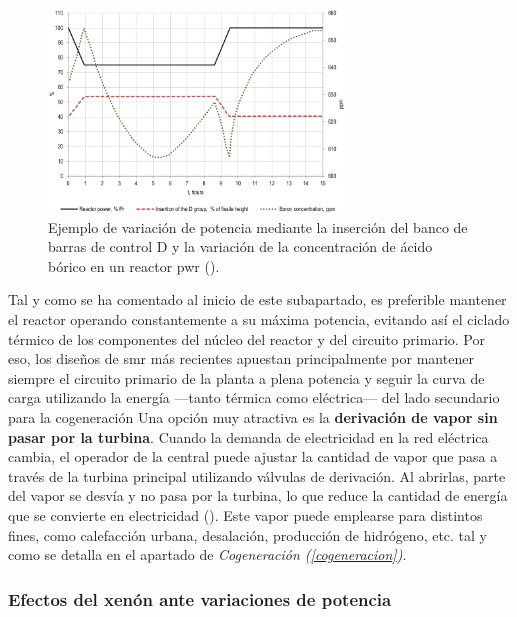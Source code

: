 \begin{figure}[h]
  \centering
  \includegraphics[width=0.7\textwidth]{content/figures/seguimiento_carga_barras_y_boro.png}
  \caption{Ejemplo de variación de potencia mediante la inserción del banco de barras de control D y la variación de la concentración de ácido bórico en un reactor \acrshort{pwr} (\cite{NEA_2011_load_following}).}
  \label{fig:seguimiento_carga_barras_y_boro}
\end{figure}

Tal y como se ha comentado al inicio de este subapartado, es preferible mantener el reactor operando constantemente a su máxima potencia, evitando así el ciclado térmico de los componentes del núcleo del reactor y del circuito primario. Por eso, los diseños de \acrshort{smr} más recientes apuestan principalmente por mantener siempre el circuito primario de la planta a plena potencia y seguir la curva de carga utilizando la energía ---tanto térmica como eléctrica--- del lado secundario para la cogeneración Una opción muy atractiva es la \textbf{derivación de vapor sin pasar por la turbina}. Cuando la demanda de electricidad en la red eléctrica cambia, el operador de la central puede ajustar la cantidad de vapor que pasa a través de la turbina principal utilizando válvulas de derivación. Al abrirlas, parte del vapor se desvía y no pasa por la turbina, lo que reduce la cantidad de energía que se convierte en electricidad (\cite{ANS_2019}). Este vapor puede emplearse para distintos fines, como calefacción urbana, desalación, producción de hidrógeno, etc. tal y como se detalla en el apartado de \textit{Cogeneración (\ref{cogeneracion})}. 

\subsubsection{Efectos del xenón ante variaciones de potencia}

